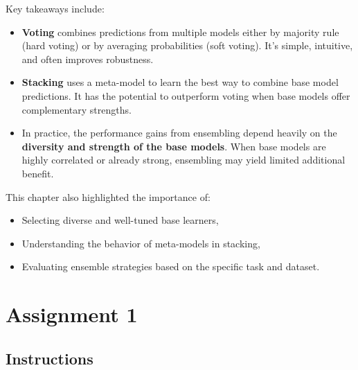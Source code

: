 \documentclass[
  letterpaper,
  DIV=11,
  numbers=noendperiod]{scrreprt}
\providecommand{\tightlist}{%
  \setlength{\itemsep}{0pt}\setlength{\parskip}{0pt}}\usepackage{longtable,booktabs,array}
\begin{document}
Key takeaways include:

\begin{itemize}
\tightlist
\item
  \textbf{Voting} combines predictions from multiple models either by
  majority rule (hard voting) or by averaging probabilities (soft
  voting). It's simple, intuitive, and often improves robustness.
\item
  \textbf{Stacking} uses a meta-model to learn the best way to combine
  base model predictions. It has the potential to outperform voting when
  base models offer complementary strengths.
\item
  In practice, the performance gains from ensembling depend heavily on
  the \textbf{diversity and strength of the base models}. When base
  models are highly correlated or already strong, ensembling may yield
  limited additional benefit.
\end{itemize}

This chapter also highlighted the importance of:

\begin{itemize}
\tightlist
\item
  Selecting diverse and well-tuned base learners,
\item
  Understanding the behavior of meta-models in stacking,
\item
  Evaluating ensemble strategies based on the specific task and dataset.
\end{itemize}

\cleardoublepage
{}
{}
\appendix

\chapter{Assignment 1}\label{assignment-1}

\section*{Instructions}\label{instructions}

\end{document}
